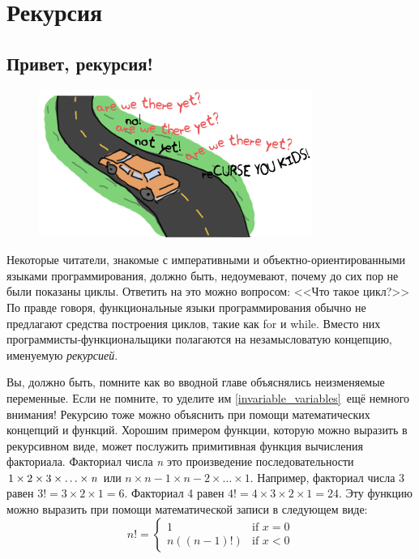 \documentclass[a4paper,12pt]{report}
\newcommand{\ops}{\colorbox{lgreen}}
\begin{document}
\chapter{Рекурсия}
\label{recursion}
\section{Привет, рекурсия!}
\begin{figure}
    \includegraphics[width=1\linewidth]{reCURSE.png}
\end{figure}
Некоторые читатели, знакомые с императивными и объектно\--ориентированными языками программирования, должно быть, недоумевают, почему до сих пор не были показаны циклы. Ответить на это можно вопросом: <<Что такое цикл?>> По правде говоря, функциональные языки программирования обычно не предлагают средства построения циклов, такие как \ops{for} и \ops{while}. Вместо них программисты\--функциональщики полагаются на незамысловатую концепцию, именуемую \emph{рекурсией}.

Вы, должно быть, помните как во вводной главе объяснялись неизменяемые переменные. Если не помните, то уделите им \ref{invariable_variables}{~ещё немного внимания}! Рекурсию тоже можно объяснить при помощи математических концепций и функций. Хорошим примером функции, которую можно выразить в рекурсивном виде, может послужить примитивная функция вычисления факториала. Факториал числа \emph{n} это произведение последовательности \ops{$1\times 2\times3\times\ldots\times\emph{n}$} или \ops{$n\times n-1 \times n-2\times\ldots\times 1$}. Например, факториал числа 3 равен \ops{$3! = 3 \times 2 \times 1 = 6$}. Факториал 4 равен \ops{$4! = 4 \times 3 \times 2 \times 1 = 24$}. Эту функцию можно выразить при помощи математической записи в следующем виде:
\[
n! =
  \begin{cases}
   1           & \text{if } x = 0 \\
   n((n - 1)!) & \text{if } x < 0
  \end{cases}
\]
\end{document}
